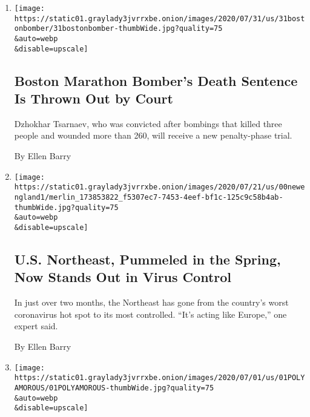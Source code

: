 \begin{enumerate}
\def\labelenumi{\arabic{enumi}.}
\item
  \href{/2020/07/31/us/dzhokhar-tsarnaev-boston-marathon-bomber.html}{}

  \texttt{[image: https://static01.graylady3jvrrxbe.onion/images/2020/07/31/us/31bostonbomber/31bostonbomber-thumbWide.jpg?quality=75\\\&auto=webp\\\&disable=upscale]}

  \hypertarget{boston-marathon-bombers-death-sentence-is-thrown-out-by-court}{%
  \subsection{Boston Marathon Bomber's Death Sentence Is Thrown Out by
  Court}\label{boston-marathon-bombers-death-sentence-is-thrown-out-by-court}}

  Dzhokhar Tsarnaev, who was convicted after bombings that killed three
  people and wounded more than 260, will receive a new penalty-phase
  trial.

  By Ellen Barry
\item
  \href{/2020/07/22/us/coronavirus-northeast-governors.html}{}

  \texttt{[image: https://static01.graylady3jvrrxbe.onion/images/2020/07/21/us/00newengland1/merlin\_173853822\_f5307ec7-7453-4eef-bf1c-125c9c58b4ab-thumbWide.jpg?quality=75\\\&auto=webp\\\&disable=upscale]}

  \hypertarget{us-northeast-pummeled-in-the-spring-now-stands-out-in-virus-control}{%
  \subsection{U.S. Northeast, Pummeled in the Spring, Now Stands Out in
  Virus
  Control}\label{us-northeast-pummeled-in-the-spring-now-stands-out-in-virus-control}}

  In just over two months, the Northeast has gone from the country's
  worst coronavirus hot spot to its most controlled. ``It's acting like
  Europe,'' one expert said.

  By Ellen Barry
\item
  \href{/2020/07/01/us/somerville-polyamorous-domestic-partnership.html}{}

  \texttt{[image: https://static01.graylady3jvrrxbe.onion/images/2020/07/01/us/01POLYAMOROUS/01POLYAMOROUS-thumbWide.jpg?quality=75\\\&auto=webp\\\&disable=upscale]}

  \hypertarget{a-massachusetts-city-decides-to-recognize-polyamorous-relationships}{%
}
\end{enumerate}
